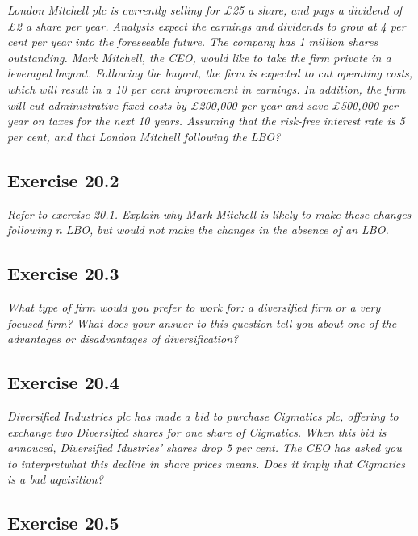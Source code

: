 \documentclass[]{book}
\theoremstyle{definition}
\theoremstyle{definition}
\theoremstyle{remark}
\begin{document}
\emph{London Mitchell plc is currently selling for £25 a share, and pays
a dividend of £2 a share per year. Analysts expect the earnings and
dividends to grow at 4 per cent per year into the foreseeable future.
The company has 1 million shares outstanding. Mark Mitchell, the CEO,
would like to take the firm private in a leveraged buyout. Following the
buyout, the firm is expected to cut operating costs, which will result
in a 10 per cent improvement in earnings. In addition, the firm will cut
administrative fixed costs by £200,000 per year and save £500,000 per
year on taxes for the next 10 years. Assuming that the risk-free
interest rate is 5 per cent, and that London Mitchell following the
LBO?} \citep[p.678]{book}

\subsection{Exercise 20.2}\label{exercise-20.2}

\emph{Refer to exercise 20.1. Explain why Mark Mitchell is likely to
make these changes following n LBO, but would not make the changes in
the absence of an LBO.} \citep[p.678]{book}

\subsection{Exercise 20.3}\label{exercise-20.3}

\emph{What type of firm would you prefer to work for: a diversified firm
or a very focused firm? What does your answer to this question tell you
about one of the advantages or disadvantages of diversification?}
\citep[p.678]{book}

\subsection{Exercise 20.4}\label{exercise-20.4}

\emph{Diversified Industries plc has made a bid to purchase Cigmatics
plc, offering to exchange two Diversified shares for one share of
Cigmatics. When this bid is annouced, Diversified Idustries' shares drop
5 per cent. The CEO has asked you to interpretwhat this decline in share
prices means. Does it imply that Cigmatics is a bad aquisition?}
\citep[p.678]{book}

\subsection{Exercise 20.5}\label{exercise-20.5}
\end{document}
